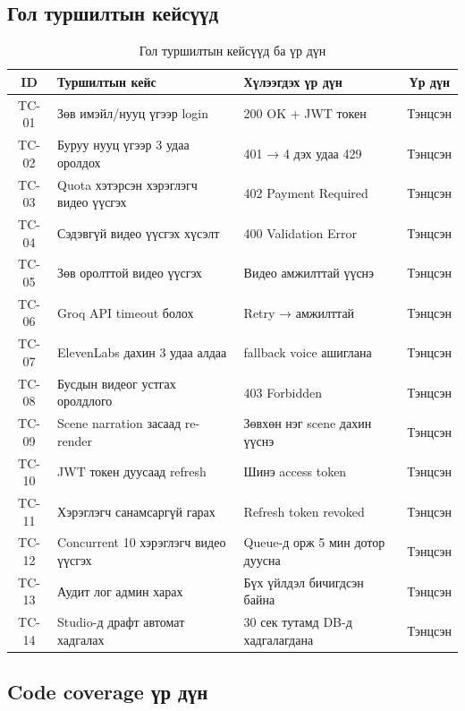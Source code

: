 \subsection{Гол туршилтын кейсүүд}

\begin{table}[H]
\centering
\label{tab:test_cases}
\begin{tabular}{|c|p{4.5cm}|p{3.5cm}|c|}
\hline
\textbf{ID} & \textbf{Туршилтын кейс} & \textbf{Хүлээгдэх үр дүн} & \textbf{Үр дүн} \\
\hline
TC-01 & Зөв имэйл/нууц үгээр login & 200 OK + JWT токен & Тэнцсэн \\
\hline
TC-02 & Буруу нууц үгээр 3 удаа оролдох & 401 → 4 дэх удаа 429 & Тэнцсэн \\
\hline
TC-03 & Quota хэтэрсэн хэрэглэгч видео үүсгэх & 402 Payment Required & Тэнцсэн \\
\hline
TC-04 & Сэдэвгүй видео үүсгэх хүсэлт & 400 Validation Error & Тэнцсэн \\
\hline
TC-05 & Зөв оролттой видео үүсгэх & Видео амжилттай үүснэ & Тэнцсэн \\
\hline
TC-06 & Groq API timeout болох & Retry → амжилттай & Тэнцсэн \\
\hline
TC-07 & ElevenLabs дахин 3 удаа алдаа & fallback voice ашиглана & Тэнцсэн \\
\hline
TC-08 & Бусдын видеог устгах оролдлого & 403 Forbidden & Тэнцсэн \\
\hline
TC-09 & Scene narration засаад re-render & Зөвхөн нэг scene дахин үүснэ & Тэнцсэн \\
\hline
TC-10 & JWT токен дуусаад refresh & Шинэ access token & Тэнцсэн \\
\hline
TC-11 & Хэрэглэгч санамсаргүй гарах & Refresh token revoked & Тэнцсэн \\
\hline
TC-12 & Concurrent 10 хэрэглэгч видео үүсгэх & Queue-д орж 5 мин дотор дуусна & Тэнцсэн \\
\hline
TC-13 & Аудит лог админ харах & Бүх үйлдэл бичигдсэн байна & Тэнцсэн \\
\hline
TC-14 & Studio-д драфт автомат хадгалах & 30 сек тутамд DB-д хадгалагдана & Тэнцсэн \\
\hline
\end{tabular}
\caption{Гол туршилтын кейсүүд ба үр дүн}
\end{table}

\subsection{Code coverage үр дүн}

